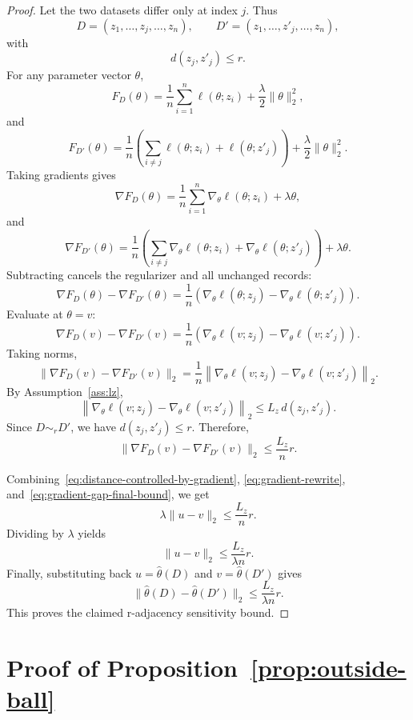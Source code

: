 \documentclass[11pt,a4paper]{report}
\theoremstyle{plain}
\theoremstyle{definition}
\theoremstyle{remark}
\begin{document}
\begin{proof}
Let the two datasets differ only at index $j$. Thus
\[
D=(z_1,\dots,z_j,\dots,z_n),
\qquad
D'=(z_1,\dots,z'_j,\dots,z_n),
\]
with
\[
d(z_j,z'_j)\le r.
\]
For any parameter vector $\theta$,
\[
F_D(\theta)
=
\frac{1}{n}\sum_{i=1}^n \ell(\theta;z_i)
+
\frac{\lambda}{2}\|\theta\|_2^2,
\]
and
\[
F_{D'}(\theta)
=
\frac{1}{n}
\left(
\sum_{i\neq j}\ell(\theta;z_i)
+
\ell(\theta;z'_j)
\right)
+
\frac{\lambda}{2}\|\theta\|_2^2.
\]
Taking gradients gives
\[
\nabla F_D(\theta)
=
\frac{1}{n}\sum_{i=1}^n \nabla_\theta \ell(\theta;z_i)
+
\lambda\theta,
\]
and
\[
\nabla F_{D'}(\theta)
=
\frac{1}{n}
\left(
\sum_{i\neq j}\nabla_\theta \ell(\theta;z_i)
+
\nabla_\theta \ell(\theta;z'_j)
\right)
+
\lambda\theta.
\]
Subtracting cancels the regularizer and all unchanged records:
\[
\nabla F_D(\theta)-\nabla F_{D'}(\theta)
=
\frac{1}{n}
\left(
\nabla_\theta \ell(\theta;z_j)
-
\nabla_\theta \ell(\theta;z'_j)
\right).
\]
Evaluate at $\theta=v$:
\[
\nabla F_D(v)-\nabla F_{D'}(v)
=
\frac{1}{n}
\left(
\nabla_\theta \ell(v;z_j)
-
\nabla_\theta \ell(v;z'_j)
\right).
\]
Taking norms,
\[
\|\nabla F_D(v)-\nabla F_{D'}(v)\|_2
=
\frac{1}{n}
\left\|
\nabla_\theta \ell(v;z_j)
-
\nabla_\theta \ell(v;z'_j)
\right\|_2.
\]
By Assumption~\ref{ass:lz},
\[
\left\|
\nabla_\theta \ell(v;z_j)
-
\nabla_\theta \ell(v;z'_j)
\right\|_2
\le
L_z\,d(z_j,z'_j).
\]
Since $D\sim_r D'$, we have $d(z_j,z'_j)\le r$. Therefore,
\begin{equation}
\label{eq:gradient-gap-final-bound}
\|\nabla F_D(v)-\nabla F_{D'}(v)\|_2
\le
\frac{L_z}{n}r.
\end{equation}

Combining~\eqref{eq:distance-controlled-by-gradient},
\eqref{eq:gradient-rewrite}, and~\eqref{eq:gradient-gap-final-bound}, we get
\[
\lambda\|u-v\|_2
\le
\frac{L_z}{n}r.
\]
Dividing by $\lambda$ yields
\[
\|u-v\|_2
\le
\frac{L_z}{\lambda n}r.
\]
Finally, substituting back $u=\hat\theta(D)$ and $v=\hat\theta(D')$ gives
\[
\|\hat\theta(D)-\hat\theta(D')\|_2
\le
\frac{L_z}{\lambda n}r.
\]
This proves the claimed r-adjacency sensitivity bound.
\end{proof}

\section{Proof of Proposition~\ref{prop:outside-ball}}
\label{app:proof-outside-ball}
\end{document}
